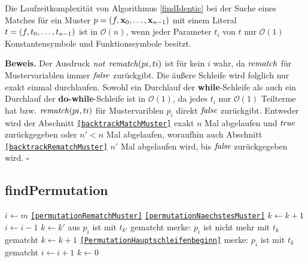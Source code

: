 \begin{lemma}\label{lemKomplexitaetFindPermutation}
Die Laufzeitkomplexität von Algorithmus \ref{findIdentic} bei der Suche eines Matches für ein Muster $p = (f, {\mathbf x}_{0}, \dots, {\mathbf x}_{n-1})$ mit einem Literal $t = (f, {t}_{0}, \dots, {t}_{n-1})$ ist in $\mathcal O(n)$, wenn jeder Parameter $t_i$ von $t$ nur $\mathcal O(1)$ Konstantensymbole und Funktionssymbole besitzt.
\end{lemma}

\textbf{Beweis.}
Der Ausdruck $\mathit{not}$ $\mathit{rematch}(pi , ti)$ ist für kein $i$ wahr, da $\mathit{rematch}$ für Mustervariablen immer $\mathit{false}$ zurückgibt. Die äußere Schleife wird folglich nur exakt einmal durchlaufen. Sowohl ein Durchlauf der \textbf{while}-Schleife als auch ein Durchlauf der \textbf{do-while}-Schleife ist in $\mathcal O(1)$, da jedes $t_i$ nur $\mathcal O(1)$ Teilterme hat bzw. $\mathit{rematch}(pi , ti)$ für Mustervariblen $p_i$ direkt $\mathit{false}$ zurückgibt. Entweder wird der Abschnitt \texttt{\ref{backtrackMatchMuster}} exakt $n$ Mal abgelaufen und $\mathit{true}$ zurückgegeben oder $n' < n$ Mal abgelaufen, woraufhin auch Abschnitt \texttt{\ref{backtrackRematchMuster}} $n'$ Mal abgelaufen wird, bis $\mathit{false}$ zurückgegeben wird. 
\hfill $\square$\\



\subsection {findPermutation}
\begin{algorithm}
\DontPrintSemicolon
\caption{$\Const{findPermutation} \colon M \times T \times \mathit{Bool} \rightarrow \mathit{Bool}$}\label{findPermutation}
\;
 {
	$i \leftarrow m$\;
	\Goto \texttt{\ref{permutationRematchMuster}}\;
}
  {
 }
 \label{PermutationHauptschleifenbeginn}
  {
	 {
		 {
			 {
				\Goto \texttt{\ref{permutationNaechstesMuster}}\;
			}
		}
		$k \leftarrow k + 1$\;
	}
	\label{permutationRematchMuster}
	 {
	}
	$i \leftarrow i - 1$\;
	{$k \leftarrow k'$ aus \glqq $p_{i}$ ist mit $t_{k'}$ gematcht\grqq{}}\;
	 {
		merke: $p_{i}$ ist nicht mehr mit $t_{k}$ gematcht\;
		$k \leftarrow k + 1$\;
		\Goto \texttt{\ref{PermutationHauptschleifenbeginn}}\;
	} 
	\label{permutationNaechstesMuster}
	merke: $p_i$ ist mit $t_k$ gematcht\;
	$i \leftarrow i + 1$\;
	$k \leftarrow 0$\;    
 }
\end{algorithm}

